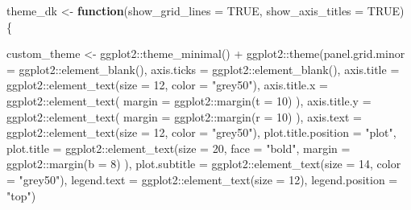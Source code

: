 \documentclass[
]{book}
\newenvironment{Shaded}{\begin{snugshade}}{\end{snugshade}}
\newcommand{\AttributeTok}[1]{\textcolor[rgb]{0.77,0.63,0.00}{#1}}
\newcommand{\ConstantTok}[1]{\textcolor[rgb]{0.00,0.00,0.00}{#1}}
\newcommand{\ControlFlowTok}[1]{\textcolor[rgb]{0.13,0.29,0.53}{\textbf{#1}}}
\newcommand{\DecValTok}[1]{\textcolor[rgb]{0.00,0.00,0.81}{#1}}
\newcommand{\FunctionTok}[1]{\textcolor[rgb]{0.00,0.00,0.00}{#1}}
\newcommand{\NormalTok}[1]{#1}
\newcommand{\OtherTok}[1]{\textcolor[rgb]{0.56,0.35,0.01}{#1}}
\newcommand{\SpecialCharTok}[1]{\textcolor[rgb]{0.00,0.00,0.00}{#1}}
\newcommand{\StringTok}[1]{\textcolor[rgb]{0.31,0.60,0.02}{#1}}
\begin{document}
\begin{Shaded}
\begin{Highlighting}[]
\NormalTok{theme\_dk }\OtherTok{\textless{}{-}} \ControlFlowTok{function}\NormalTok{(}\AttributeTok{show\_grid\_lines =} \ConstantTok{TRUE}\NormalTok{,}
                     \AttributeTok{show\_axis\_titles =} \ConstantTok{TRUE}\NormalTok{) \{}
  
\NormalTok{  custom\_theme }\OtherTok{\textless{}{-}}\NormalTok{ ggplot2}\SpecialCharTok{::}\FunctionTok{theme\_minimal}\NormalTok{() }\SpecialCharTok{+}
\NormalTok{    ggplot2}\SpecialCharTok{::}\FunctionTok{theme}\NormalTok{(}\AttributeTok{panel.grid.minor =}\NormalTok{ ggplot2}\SpecialCharTok{::}\FunctionTok{element\_blank}\NormalTok{(),}
                   \AttributeTok{axis.ticks =}\NormalTok{ ggplot2}\SpecialCharTok{::}\FunctionTok{element\_blank}\NormalTok{(),}
                   \AttributeTok{axis.title =}\NormalTok{ ggplot2}\SpecialCharTok{::}\FunctionTok{element\_text}\NormalTok{(}\AttributeTok{size =} \DecValTok{12}\NormalTok{,}
                                                      \AttributeTok{color =} \StringTok{"grey50"}\NormalTok{),}
                   \AttributeTok{axis.title.x =}\NormalTok{ ggplot2}\SpecialCharTok{::}\FunctionTok{element\_text}\NormalTok{(}
                     \AttributeTok{margin =}\NormalTok{ ggplot2}\SpecialCharTok{::}\FunctionTok{margin}\NormalTok{(}\AttributeTok{t =} \DecValTok{10}\NormalTok{)}
\NormalTok{                   ),}
                   \AttributeTok{axis.title.y =}\NormalTok{ ggplot2}\SpecialCharTok{::}\FunctionTok{element\_text}\NormalTok{(}
                     \AttributeTok{margin =}\NormalTok{ ggplot2}\SpecialCharTok{::}\FunctionTok{margin}\NormalTok{(}\AttributeTok{r =} \DecValTok{10}\NormalTok{)}
\NormalTok{                   ),}
                   \AttributeTok{axis.text =}\NormalTok{ ggplot2}\SpecialCharTok{::}\FunctionTok{element\_text}\NormalTok{(}\AttributeTok{size =} \DecValTok{12}\NormalTok{,}
                                                     \AttributeTok{color =} \StringTok{"grey50"}\NormalTok{),}
                   \AttributeTok{plot.title.position =} \StringTok{"plot"}\NormalTok{,}
                   \AttributeTok{plot.title =} 
\NormalTok{                     ggplot2}\SpecialCharTok{::}\FunctionTok{element\_text}\NormalTok{(}\AttributeTok{size =} \DecValTok{20}\NormalTok{,}
                                           \AttributeTok{face =} \StringTok{"bold"}\NormalTok{,}
                                           \AttributeTok{margin =}\NormalTok{ ggplot2}\SpecialCharTok{::}\FunctionTok{margin}\NormalTok{(}\AttributeTok{b =} \DecValTok{8}\NormalTok{)}
\NormalTok{                     ),}
                   \AttributeTok{plot.subtitle =}\NormalTok{ ggplot2}\SpecialCharTok{::}\FunctionTok{element\_text}\NormalTok{(}\AttributeTok{size =} \DecValTok{14}\NormalTok{,}
                                                         \AttributeTok{color =} \StringTok{"grey50"}\NormalTok{),}
                   \AttributeTok{legend.text =}\NormalTok{ ggplot2}\SpecialCharTok{::}\FunctionTok{element\_text}\NormalTok{(}\AttributeTok{size =} \DecValTok{12}\NormalTok{),}
                   \AttributeTok{legend.position =} \StringTok{"top"}\NormalTok{)}
  

\end{Highlighting}
\end{Shaded}
\end{document}
